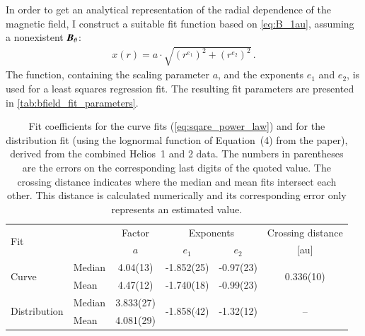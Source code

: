 In order to get an analytical representation of the radial dependence of the magnetic field, I construct a suitable fit function based on \autoref{eq:B_1au}, assuming a nonexistent $\boldsymbol{B}_\theta$:
\begin{align}
	x(r) = a \cdot \sqrt{\left(r^{e_1}\right)^2 + \left(r^{e_2}\right)^2}	\,.	\label{eq:sqare_power_law}
\end{align}
The function, containing the scaling parameter $a$, and the exponents $e_1$ and $e_2$, is used for a least squares regression fit. The resulting fit parameters are presented in \autoref{tab:bfield_fit_parameters}.
\begin{table}[htb]
	\caption{Fit coefficients for the curve fits (\autoref{eq:sqare_power_law}) and for the distribution fit (using the lognormal function of Equation~(4) from the paper), derived from the combined Helios~1 and 2 data. The numbers in parentheses are the errors on the corresponding last digits of the quoted value. The crossing distance indicates where the median and mean fits intersect each other. This distance is calculated numerically and its corresponding error only represents an estimated value.}
	\label{tab:bfield_fit_parameters}
	\centering
	\begin{tabular}{l l c c c c}
		\hline\hline
		\multirow{2}{*}{Fit}	&	&Factor	&\multicolumn{2}{c}{Exponents}	&Crossing distance\\
		\cline{4-5}
			&	&$a$	&$e_1$	&$e_2$	&[au]\\
		\hline
		\multirow{2}{*}{Curve}	&Median	&4.04(13)	&-1.852(25)	&-0.97(23)	&\multirow{2}{*}{0.336(10)}\\
			&Mean	&4.47(12)	&-1.740(18)	&-0.99(23)	&\\
		\multirow{2}{*}{Distribution}	&Median	&3.833(27)	&\multirow{2}{*}{-1.858(42)}	&\multirow{2}{*}{-1.32(12)}	&\multirow{2}{*}{--}\\
			&Mean	&4.081(29)	&	&	&\\
		\hline
	\end{tabular}
\end{table}
